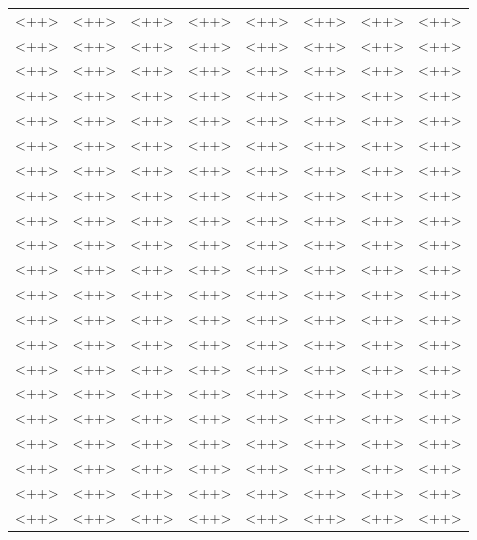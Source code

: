 \documentclass[11pt, a4paper]{article}
\begin{document}
\begin{table}[h]
\begin{center}
\begin{tabular}{lllcllll}
<++> & <++> & <++> & <++> & <++> & <++> & <++> & <++>\\
<++> & <++> & <++> & <++> & <++> & <++> & <++> & <++>\\
<++> & <++> & <++> & <++> & <++> & <++> & <++> & <++>\\
<++> & <++> & <++> & <++> & <++> & <++> & <++> & <++>\\
<++> & <++> & <++> & <++> & <++> & <++> & <++> & <++>\\
<++> & <++> & <++> & <++> & <++> & <++> & <++> & <++>\\
<++> & <++> & <++> & <++> & <++> & <++> & <++> & <++>\\
<++> & <++> & <++> & <++> & <++> & <++> & <++> & <++>\\
<++> & <++> & <++> & <++> & <++> & <++> & <++> & <++>\\
<++> & <++> & <++> & <++> & <++> & <++> & <++> & <++>\\
<++> & <++> & <++> & <++> & <++> & <++> & <++> & <++>\\
<++> & <++> & <++> & <++> & <++> & <++> & <++> & <++>\\
<++> & <++> & <++> & <++> & <++> & <++> & <++> & <++>\\
<++> & <++> & <++> & <++> & <++> & <++> & <++> & <++>\\
<++> & <++> & <++> & <++> & <++> & <++> & <++> & <++>\\
<++> & <++> & <++> & <++> & <++> & <++> & <++> & <++>\\
<++> & <++> & <++> & <++> & <++> & <++> & <++> & <++>\\
<++> & <++> & <++> & <++> & <++> & <++> & <++> & <++>\\
<++> & <++> & <++> & <++> & <++> & <++> & <++> & <++>\\
<++> & <++> & <++> & <++> & <++> & <++> & <++> & <++>\\
<++> & <++> & <++> & <++> & <++> & <++> & <++> & <++>\\
\end{tabular}
\end{center}
\end{table}
\FloatBarrier



\end{document}
